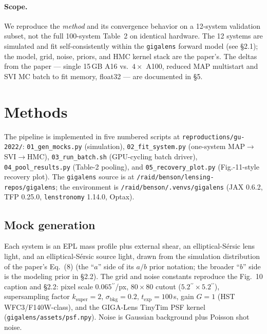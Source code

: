 \documentclass[11pt,letterpaper]{article}
\newcommand{\asec}{\ensuremath{^{\prime\prime}}}
\begin{document}
\paragraph{Scope.} We reproduce the \emph{method} and its convergence
behavior on a 12-system validation subset, not the full 100-system Table~2
on identical hardware. The 12 systems are simulated and fit
self-consistently within the \texttt{gigalens} forward model (see \S2.1);
the model, grid, noise, priors, and HMC kernel stack are the paper's. The
deltas from the paper --- single 15\,GB A16 vs.\ $4\times$ A100, reduced MAP
multistart and SVI MC batch to fit memory, float32 --- are documented in
\S5.

\section{Methods}

The pipeline is implemented in five numbered scripts at
\texttt{reproductions/gu-2022/}: \texttt{01\_gen\_mocks.py} (simulation),
\texttt{02\_fit\_system.py} (one-system MAP$\to$SVI$\to$HMC),
\texttt{03\_run\_batch.sh} (GPU-cycling batch driver),
\texttt{04\_pool\_results.py} (Table-2 pooling), and
\texttt{05\_recovery\_plot.py} (Fig.-11-style recovery plot). The
\texttt{gigalens} source is at
\texttt{/raid/benson/lensing-repos/gigalens}; the environment is
\texttt{/raid/benson/.venvs/gigalens} (JAX 0.6.2, TFP 0.25.0,
\texttt{lenstronomy} 1.14.0, Optax).

\subsection{Mock generation}

Each system is an EPL mass profile \citep{tetarenko2017epl} plus external
shear, an elliptical-S\'ersic lens light, and an elliptical-S\'ersic source
light, drawn from the simulation distribution of the paper's Eq.~(8) (the
``$a$'' side of its $a/b$ prior notation; the broader ``$b$'' side is the
modeling prior in \S2.2). The grid and noise constants reproduce the
Fig.~10 caption and \S2.2: pixel scale $0.065\asec$/px, $80\times80$ cutout
($5.2\asec\times5.2\asec$), supersampling factor $k_{\mathrm{super}}=2$,
$\sigma_{\mathrm{bkg}}=0.2$, $t_{\mathrm{exp}}=100$\,s, gain $G=1$
(HST WFC3/F140W-class), and the GIGA-Lens TinyTim PSF kernel
(\texttt{gigalens/assets/psf.npy}). Noise is Gaussian background plus
Poisson shot noise.
\end{document}
